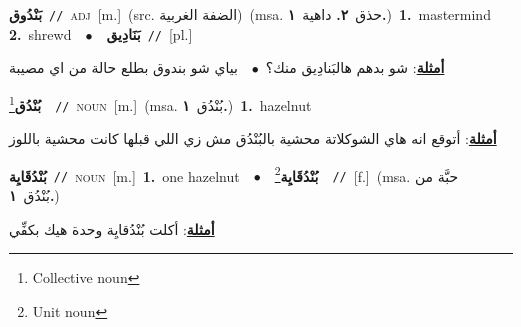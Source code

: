 \documentclass[10pt,a4paper,twoside]{article} %
\begin{document}
\begin{multicols}{2}
{\setlength\topsep{0pt}\textbf{\foreignlanguage{arabic}{بَنْدُوق}}\ {\color{gray}\texttt{//}\color{black}}\ \textsc{adj}\ [m.]\ (src. \color{gray}\foreignlanguage{arabic}{الضفة الغربية}\color{black})\ \color{gray}(msa. \foreignlanguage{arabic}{حذق}~\foreignlanguage{arabic}{\textbf{٢.}}  \foreignlanguage{arabic}{داهية}~\foreignlanguage{arabic}{\textbf{١.}})\color{black}\ \textbf{1.}~mastermind  \textbf{2.}~shrewd\ \ $\bullet$\ \ \setlength\topsep{0pt}\textbf{\foreignlanguage{arabic}{بَنَادِيق}}\ {\color{gray}\texttt{//}\color{black}}\ [pl.]\  \begin{flushright}\color{gray}\foreignlanguage{arabic}{\textbf{\underline{\foreignlanguage{arabic}{أمثلة}}}: شو بدهم هالبَنادِيق منك؟\ $\bullet$\ \  بياي شو بندوق بطلع حالة من اي مصيبة}\end{flushright}\color{black}} \vspace{2mm}

{\setlength\topsep{0pt}\textbf{\foreignlanguage{arabic}{بُنْدُق}}\footnote{Collective noun}\ \ {\color{gray}\texttt{//}\color{black}}\ \textsc{noun}\ [m.]\ \color{gray}(msa. \foreignlanguage{arabic}{بُنْدُق}~\foreignlanguage{arabic}{\textbf{١.}})\color{black}\ \textbf{1.}~hazelnut\  \begin{flushright}\color{gray}\foreignlanguage{arabic}{\textbf{\underline{\foreignlanguage{arabic}{أمثلة}}}: أتوقع انه هاي الشوكلاتة محشية بالبُنْدُق مش زي اللي قبلها كانت محشية باللوز}\end{flushright}\color{black}} \vspace{2mm}

{\setlength\topsep{0pt}\textbf{\foreignlanguage{arabic}{بُنْدُقَايِة}}\ {\color{gray}\texttt{//}\color{black}}\ \textsc{noun}\ [m.]\ \textbf{1.}~one hazelnut\ \ $\bullet$\ \ \setlength\topsep{0pt}\textbf{\foreignlanguage{arabic}{بُنْدُقَايِة}}\footnote{Unit noun}\ \ {\color{gray}\texttt{//}\color{black}}\ [f.]\ \color{gray}(msa. \foreignlanguage{arabic}{حبَّة من بُنْدُق}~\foreignlanguage{arabic}{\textbf{١.}})\color{black}\  \begin{flushright}\color{gray}\foreignlanguage{arabic}{\textbf{\underline{\foreignlanguage{arabic}{أمثلة}}}: أكلت بُنْدُقايِة وحدة هيك بكفِّي}\end{flushright}\color{black}} \vspace{2mm}


\end{multicols}
\end{document}
